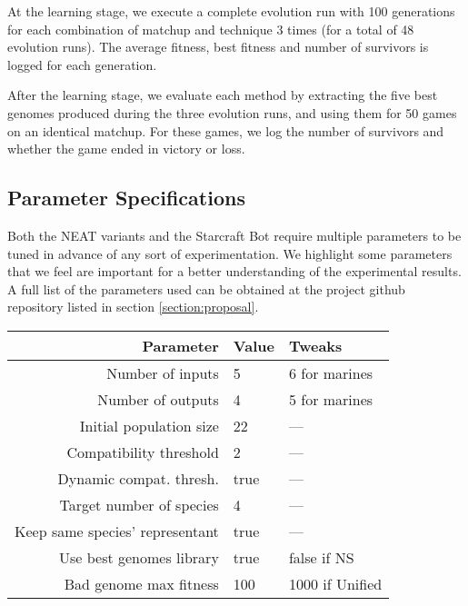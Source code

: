 At the learning stage, we execute a complete evolution run with 100
generations for each combination of matchup and technique 3 times (for
a total of 48 evolution runs). The average fitness, best fitness and
number of survivors is logged for each generation.

After the learning stage, we evaluate each method by extracting the
five best genomes produced during the three evolution runs, and using
them for 50 games on an identical matchup. For these games, we log
the number of survivors and whether the game ended in victory or loss.

\subsection{Parameter Specifications}

Both the NEAT variants and the Starcraft Bot require multiple
parameters to be tuned in advance of any sort of experimentation. We
highlight some parameters that we feel are important for a better
understanding of the experimental results. A full list of the
parameters used can be obtained at the project github repository
listed in section \ref{section:proposal}.


\begin{tabular}{rll}
    \toprule
    Parameter & Value & Tweaks \\
    \midrule
    Number of inputs & 5 & 6 for marines \\
    Number of outputs & 4 & 5 for marines \\
    Initial population size & 22  & — \\[1ex]

    Compatibility threshold & 2 & — \\
    Dynamic compat. thresh. & true & — \\
    Target number of species & 4 & — \\
    Keep same species' representant & true & — \\[1ex]

    Use best genomes library & true & false if NS \\
    Bad genome max fitness & 100 & 1000 if Unified \\
    \bottomrule
\end{tabular}

